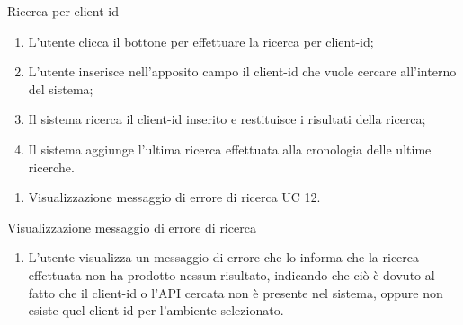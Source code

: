 \begin{usecase}{11}{Ricerca per client-id}\label{uc:ricerca-client-id}

    \usecasemain{}
        \begin{enumerate}
            \item L'utente clicca il bottone per effettuare la ricerca per client-id;
            \item L'utente inserisce nell'apposito campo il client-id che vuole cercare all'interno del sistema;
            \item Il sistema ricerca il client-id inserito e restituisce i risultati della ricerca;
            \item Il sistema aggiunge l'ultima ricerca effettuata alla cronologia delle ultime ricerche.
        \end{enumerate}

    \usecaseext{}
        \begin{enumerate}
            \item Visualizzazione messaggio di errore di ricerca UC 12.
        \end{enumerate}

\end{usecase}


\begin{usecase}{12}{Visualizzazione messaggio di errore di ricerca}\label{uc:visualizzazione-errore-ricerca}

    \usecasemain{}
        \begin{enumerate}
            \item L'utente visualizza un messaggio di errore che lo informa che la ricerca effettuata non ha prodotto nessun risultato, indicando che ciò è dovuto al fatto
            che il client-id o l'API cercata non è presente nel sistema, oppure non esiste quel client-id per l'ambiente selezionato.
        \end{enumerate}

\end{usecase}

